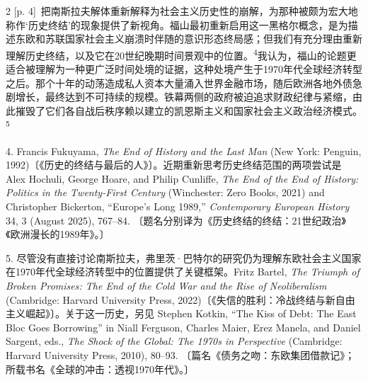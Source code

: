 \documentclass[10pt,a4paper]{article}
\begin{document}
\begin{paracol}{2}
{\scriptsize\color{gray} [p. 4]}\ 把南斯拉夫解体重新解释为社会主义历史性的崩解，为那种被颇为宏大地称作‘历史终结’的现象提供了新视角。福山最初重新启用这一黑格尔概念，是为描述东欧和苏联国家社会主义崩溃时伴随的意识形态终局感；但我们有充分理由重新理解历史终结，以及它在20世纪晚期时间景观中的位\mbox{置。\textsuperscript{4}}我认为，福山的论题更适合被理解为一种更广泛时间处境的证据，这种处境产生于1970年代全球经济转型之后。那个十年的动荡造成私人资本大量涌入世界金融市场，随后欧洲各地外债急剧增长，最终达到不可持续的规模。铁幕两侧的政府被迫追求财政纪律与紧缩，由此摧毁了它们各自战后秩序赖以建立的凯恩斯主义和国家社会主义政治经济模\mbox{式。\textsuperscript{5}}\par{\small 4. Francis Fukuyama, \textit{The End of History and the Last Man} (New York: Penguin, 1992)〔《历史的终结与最后的人》〕。近期重新思考历史终结范围的两项尝试是 Alex Hochuli, George Hoare, and Philip Cunliffe, \textit{The End of the End of History: Politics in the Twenty-First Century} (Winchester: Zero Books, 2021) and Christopher Bickerton, “Europe’s Long 1989,” \textit{Contemporary European History} 34, 3 (August 2025), 767–84. 〔题名分别译为《历史终结的终结：21世纪政治》《欧洲漫长的1989年》。〕\par}{\small 5. 尽管没有直接讨论南斯拉夫，弗里茨·巴特尔的研究仍为理解东欧社会主义国家在1970年代全球经济转型中的位置提供了关键框架。Fritz Bartel, \textit{The Triumph of Broken Promises: The End of the Cold War and the Rise of Neoliberalism} (Cambridge: Harvard University Press, 2022)〔《失信的胜利：冷战终结与新自由主义崛起》〕。关于这一历史，另见 Stephen Kotkin, “The Kiss of Debt: The East Bloc Goes Borrowing” in Niall Ferguson, Charles Maier, Erez Manela, and Daniel Sargent, eds., \textit{The Shock of the Global: The 1970s in Perspective} (Cambridge: Harvard University Press, 2010), 80–93. 〔篇名《债务之吻：东欧集团借款记》；所载书名《全球的冲击：透视1970年代》。〕\par}
\switchcolumn

\end{paracol}
\end{document}
